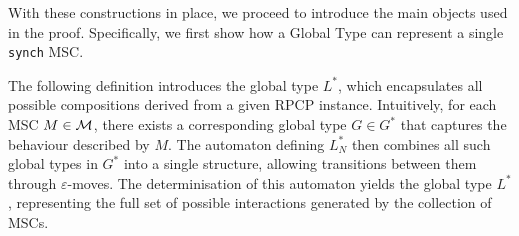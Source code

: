 With these constructions in place, we proceed to introduce the main  
objects used in the proof. Specifically, we first show how a Global  
Type can represent a single \verb|synch| MSC.




The following definition introduces the global type $L^*$, which
encapsulates all possible compositions derived from a given RPCP instance.
Intuitively, for each MSC $M \in \mathcal{M}$, there exists a corresponding
global type $G \in G^*$ that captures the behaviour described by $M$.
The automaton defining $L^*_N$ then combines all such global types in $G^*$
into a single structure, allowing transitions between them through
$\varepsilon$-moves. The determinisation of this automaton yields the
global type $L^*$, representing the full set of possible interactions
generated by the collection of MSCs.

\bigskip

